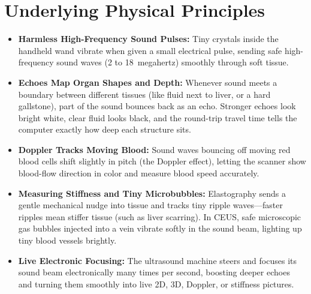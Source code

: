 \section{Underlying Physical Principles}
\begin{itemize}
  \item \textbf{Harmless High-Frequency Sound Pulses:} Tiny crystals inside the handheld wand vibrate when given a small electrical pulse, sending safe high-frequency sound waves (2 to 18~megahertz) smoothly through soft tissue.
  \item \textbf{Echoes Map Organ Shapes and Depth:} Whenever sound meets a boundary between different tissues (like fluid next to liver, or a hard gallstone), part of the sound bounces back as an echo. Stronger echoes look bright white, clear fluid looks black, and the round-trip travel time tells the computer exactly how deep each structure sits.
  \item \textbf{Doppler Tracks Moving Blood:} Sound waves bouncing off moving red blood cells shift slightly in pitch (the Doppler effect), letting the scanner show blood-flow direction in color and measure blood speed accurately.
  \item \textbf{Measuring Stiffness and Tiny Microbubbles:} Elastography sends a gentle mechanical nudge into tissue and tracks tiny ripple waves---faster ripples mean stiffer tissue (such as liver scarring). In CEUS, safe microscopic gas bubbles injected into a vein vibrate softly in the sound beam, lighting up tiny blood vessels brightly.
  \item \textbf{Live Electronic Focusing:} The ultrasound machine steers and focuses its sound beam electronically many times per second, boosting deeper echoes and turning them smoothly into live 2D, 3D, Doppler, or stiffness pictures.
\end{itemize}

